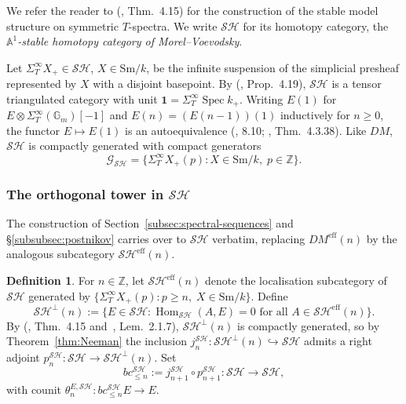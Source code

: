 \documentclass[12pt,a4paper]{article}
\theoremstyle{definition}
\newtheorem{definition}[theorem]{Definition}
\newcommand{\Sm}{\mathrm{Sm}}
\newcommand{\SH}{\mathcal{SH}}
\newcommand{\Hom}{\operatorname{Hom}}
\newcommand{\Z}{\mathbb{Z}}
\newcommand{\Gm}{\mathbb{G}_m}
\begin{document}
We refer the reader to (\cite{Jar00}, Thm.\ 4.15) for the construction of the
stable model structure on symmetric $T$-spectra.  We write $\SH$ for its homotopy
category, the \emph{$\mathbb{A}^1$-stable homotopy category of Morel--Voevodsky}.

Let $\Sigma_T^\infty X_+\in\SH$, $X\in\Sm/k$, be the infinite suspension of the
simplicial presheaf represented by $X$ with a disjoint basepoint.  By
(\cite{Jar00}, Prop.\ 4.19), $\SH$ is a tensor triangulated category with unit
$\mathbf{1}=\Sigma_T^\infty\operatorname{Spec} k_+$.  Writing $E(1)$ for
$E\otimes\Sigma_T^\infty(\Gm)[-1]$ and $E(n)=(E(n-1))(1)$ inductively for $n\geq 0$,
the functor $E\mapsto E(1)$ is an autoequivalence (\cite{Hov01}, 8.10;
\cite{Ayo07}, Thm.\ 4.3.38).  Like $DM$, $\SH$ is compactly generated with compact
generators
\[
  \mathcal{G}_{\SH} = \bigl\{\Sigma_T^\infty X_+(p): X\in\Sm/k,\; p\in\Z\bigr\}.
\]

\subsubsection{The orthogonal tower in $\SH$}
\label{subsubsec:SH-tower}

The construction of Section~\ref{subsec:spectral-sequences} and §\ref{subsubsec:postnikov}
carries over to $\SH$ verbatim, replacing $DM^{\mathrm{eff}}(n)$ by the analogous
subcategory $\SH^{\mathrm{eff}}(n)$.

\begin{definition}\label{def:SHeff-n}
For $n\in\Z$, let $\SH^{\mathrm{eff}}(n)$ denote the localisation subcategory of $\SH$
generated by $\{\Sigma_T^\infty X_+(p): p\geq n,\; X\in\Sm/k\}$.  Define
\[
  \SH^\perp(n) := \bigl\{E\in\SH : \Hom_{\SH}(A,E)=0
    \text{ for all }A\in\SH^{\mathrm{eff}}(n)\bigr\}.
\]
By (\cite{Jar00}, Thm.\ 4.15 and~\cite{Pel17}, Lem.\ 2.1.7), $\SH^\perp(n)$ is
compactly generated, so by Theorem~\ref{thm:Neeman} the inclusion
$j_n^{\SH}:\SH^\perp(n)\hookrightarrow\SH$ admits a right adjoint
$p_n^{\SH}:\SH\to\SH^\perp(n)$.  Set
\[
  bc_{\leq n}^{\SH} := j_{n+1}^{\SH}\circ p_{n+1}^{\SH}:\SH\longrightarrow\SH,
\]
with counit $\theta_n^{E,\SH}:bc_{\leq n}^{\SH}E\to E$.
\end{definition}
\end{document}
